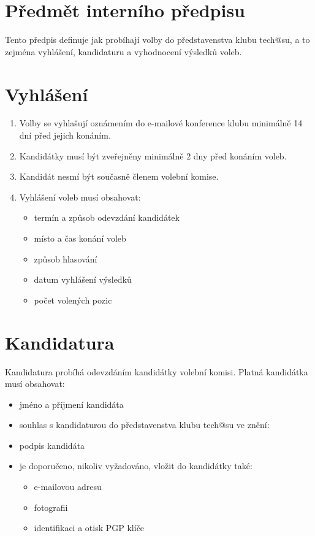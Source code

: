 \documentclass[10pt]{article}
\begin{document}
\section{Předmět interního předpisu}
	Tento předpis definuje jak probíhají volby do představenstva klubu tech@su, a to zejména vyhlášení, kandidaturu a vyhodnocení výsledků voleb.

\section{Vyhlášení}
	\begin{enumerate}
		\item Volby se vyhlašují oznámením do e-mailové konference klubu minimálně 14 dní před jejich konáním.
		\item Kandidátky musí být zveřejněny minimálně 2 dny před konáním voleb.
		\item Kandidát nesmí být současně členem volební komise.
		\item Vyhlášení voleb musí obsahovat:
			\begin{itemize}
				\item termín a způsob odevzdání kandidátek
				\item místo a čas konání voleb
				\item způsob hlasování
				\item datum vyhlášení výsledků
				\item počet volených pozic
			\end{itemize}
	\end{enumerate}
	
\section{Kandidatura}
	Kandidatura probíhá odevzdáním kandidátky volební komisi. Platná kandidátka musí obsahovat:
	\begin{itemize}
		\item jméno a příjmení kandidáta
		\item souhlas s kandidaturou do představenstva klubu tech@su ve znění: 
		\item podpis kandidáta
		\item je doporučeno, nikoliv vyžadováno, vložit do kandidátky také: 
			\begin{itemize}
				\item e-mailovou adresu
				\item fotografii
				\item identifikaci a otisk PGP klíče
			\end{itemize}
	\end{itemize}
\end{document}
